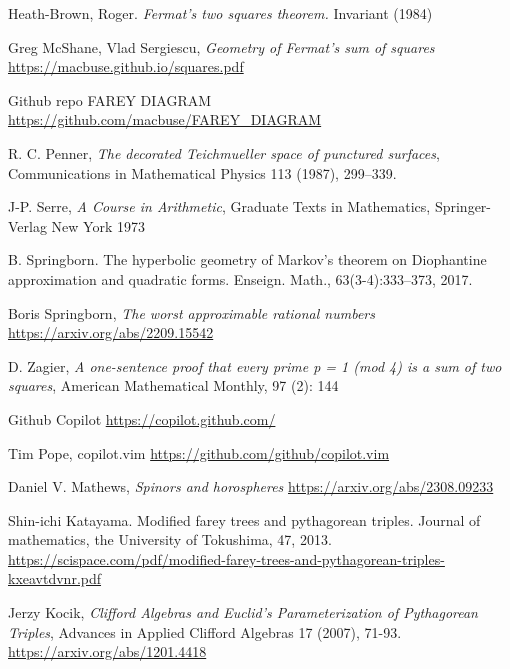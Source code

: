 \documentclass[12pt,a4paper]{amsart}
\begin{document}
Heath-Brown, Roger. 
\textit{ Fermat’s two squares theorem.} Invariant (1984) 



Greg McShane, Vlad Sergiescu,
\textit{Geometry of Fermat's sum of squares}
\url{https://macbuse.github.io/squares.pdf}

Github repo FAREY DIAGRAM \url{https://github.com/macbuse/FAREY_DIAGRAM}

R. C. Penner, 
\textit{The decorated Teichmueller space of punctured surfaces}, 
Communications in Mathematical Physics 113 (1987), 299–339.



J-P. Serre,
\textit{A Course in Arithmetic},
Graduate Texts in Mathematics,
Springer-Verlag New York
1973



B. Springborn. The hyperbolic geometry of Markov’s theorem on Diophantine
approximation and quadratic forms. Enseign. Math., 63(3-4):333–373, 2017.

Boris Springborn,
\textit{The worst approximable rational numbers}
\url{https://arxiv.org/abs/2209.15542}



D. Zagier,
 \textit{A one-sentence proof that every prime p = 1 (mod 4) is a sum of two squares}, 
 American Mathematical Monthly, 97 (2): 144

 Github Copilot \url{https://copilot.github.com/}

Tim Pope, copilot.vim \url{https://github.com/github/copilot.vim}
 

Daniel V. Mathews,
\textit{Spinors and horospheres}
\url{https://arxiv.org/abs/2308.09233}

 Shin-ichi Katayama. Modified farey trees and pythagorean triples.
 Journal of mathematics, the University of Tokushima, 47, 2013.
 \url{https://scispace.com/pdf/modified-farey-trees-and-pythagorean-triples-kxeavtdvnr.pdf}

Jerzy Kocik,
\textit{Clifford Algebras and Euclid's Parameterization of Pythagorean Triples},
Advances in Applied Clifford Algebras 17 (2007), 71-93.
\url{https://arxiv.org/abs/1201.4418}
\end{document}
